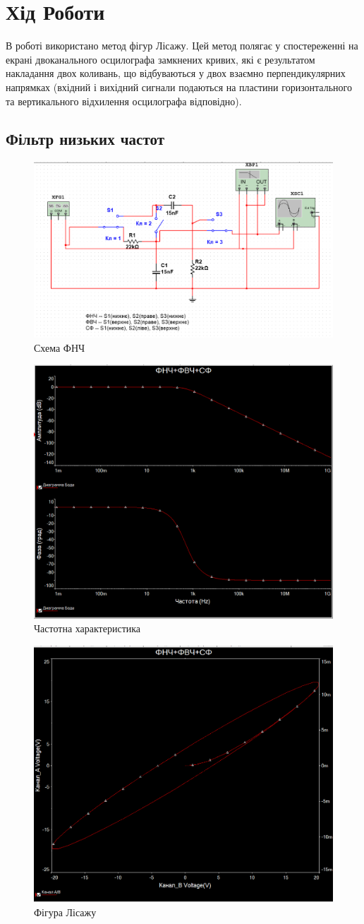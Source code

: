 \documentclass[
  ukrainian,
  14pt
]{extreport}
\begin{document}
\section{Хід Роботи}
В роботі використано метод фігур Лісажу. Цей метод полягає у спостереженні на екрані двоканального осцилографа
замкнених кривих, які є результатом накладання двох коливань, що відбуваються
у двох взаємно перпендикулярних напрямках (вхідний і вихідний сигнали
подаються на пластини горизонтального та вертикального відхилення
осцилографа відповідно).

\subsection{Фільтр низьких частот}
\begin{figure}[H]
  \centering
  \includegraphics[width=.6\textwidth]{imgs/FNC-1.png}
  \caption{Схема ФНЧ}
\end{figure}
\begin{figure}[H]
  \centering
  \includegraphics[width=.6\textwidth]{imgs/FNC-2.png}
  \caption{Частотна характеристика}
\end{figure}
\begin{figure}[H]
  \centering
  \includegraphics[width=.6\textwidth]{imgs/FNC-3.png}
  \caption{Фігура Лісажу}
\end{figure}
\end{document}
